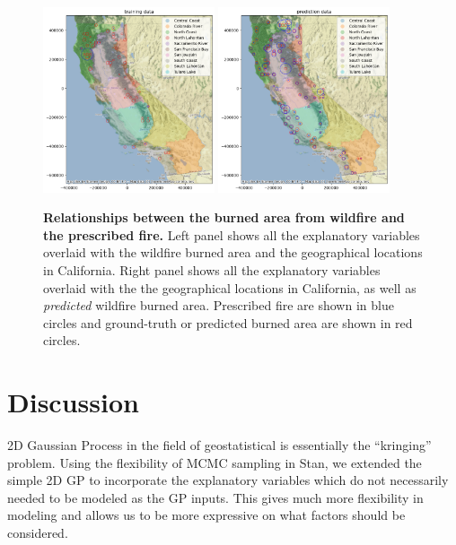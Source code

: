 \documentclass{article}
\begin{document}
\begin{figure}[!t]
  \centering
\includegraphics[width=0.45\textwidth]{latex_template/figs/trained_rez.png}
\includegraphics[width=0.45\textwidth]{latex_template/figs/predicted_rez.png}
\caption{\textbf{Relationships between the burned area from wildfire and the prescribed fire. } Left panel shows all the explanatory variables overlaid with the wildfire burned area and the geographical locations in California. Right panel shows all the explanatory variables overlaid with the the geographical locations in California, as well as \textit{predicted} wildfire burned area. Prescribed fire are shown in blue circles and ground-truth or predicted burned area are shown in red circles. }
\label{fig:data}
\end{figure}





\section{Discussion}
2D Gaussian Process in the field of geostatistical is essentially the ``kringing'' problem. Using the flexibility of MCMC sampling in Stan, we extended the simple 2D GP to incorporate the explanatory variables which do not necessarily needed to be modeled as the GP inputs. This gives much more flexibility in modeling and allows us to be more expressive on what factors should be considered. 
\end{document}

